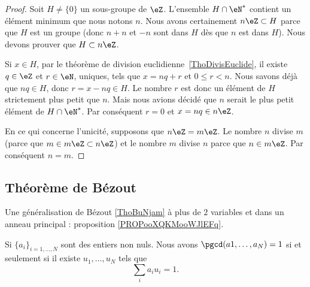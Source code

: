 \begin{proof}
	Soit \( H\neq\{ 0 \}\) un sous-groupe de \( \eZ\). L'ensemble \( H\cap\eN^*\) contient un élément minimum que nous notons \( n\). Nous avons certainement \( n\eZ\subset H\) parce que \( H\) est un groupe (donc \( n+n\) et \( -n\) sont dans \( H\) dès que \( n\) est dans \( H\)). Nous devons prouver que \( H\subset n\eZ\).

	Si \( x\in H\), par le théorème de division euclidienne~\ref{ThoDivisEuclide}, il existe \( q\in\eZ\) et \( r\in\eN \), uniques, tels que \( x=nq+r\) et \(0 \leq r < n \). Nous savons déjà que \( nq\in H\), donc \( r = x - nq \in H \). Le nombre \( r\) est donc un élément de \( H\) strictement plus petit que \( n\). Mais nous avions décidé que \( n\) serait le plus petit élément de \( H\cap\eN^*\). Par conséquent \( r=0\) et \( x=nq\in n\eZ\).


	En ce qui concerne l'unicité, supposons que \( n\eZ=m\eZ\). Le nombre \( n\) divise \( m\) (parce que \( m\in m\eZ\subset n\eZ\)) et le nombre \( m\) divise \( n\) parce que \( n\in m\eZ\). Par conséquent \( n=m\).
\end{proof}


\subsection{Théorème de Bézout}


Une généralisation de Bézout \ref{ThoBuNjam} à plus de \( 2\) variables et dans un anneau principal : proposition \ref{PROPooXQKMooWJlEFq}.

\begin{theorem} \label{ThoBuNjam}
	Si \( \{ a_i \}_{i=1,\ldots, N}\) sont des entiers non nuls. Nous avons \( \pgcd(a1,\ldots,a_N)=1\) si et seulement si il existe \( u_1,\ldots,u_N\) tels que
	\begin{equation}
		\sum_ia_iu_i=1.
	\end{equation}
\end{theorem}


